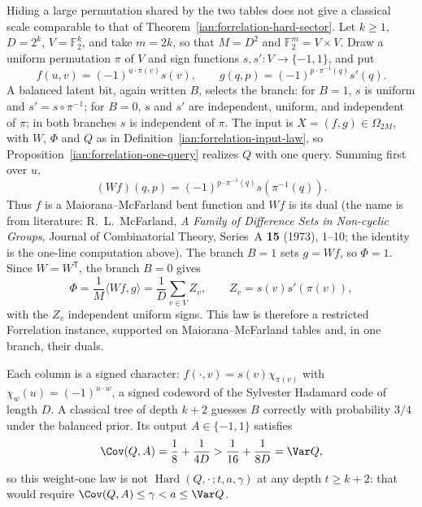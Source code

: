 \begin{remark}\label{ian:forrelation-permutation-overlap}
Hiding a large permutation shared by the two tables does not give a classical scale comparable to that of Theorem~\ref{ian:forrelation-hard-sector}. Let \(k\ge1\), \(D=2^k\), \(V=\mathbb F_2^k\), and take \(m=2k\), so that \(M=D^2\) and \(\mathbb F_2^m=V\times V\). Draw a uniform permutation \(\pi\) of \(V\) and sign functions \(s,s':V\to\{-1,1\}\), and put
\[
 f(u,v)=(-1)^{u\cdot\pi(v)}s(v),
 \qquad
 g(q,p)=(-1)^{p\cdot\pi^{-1}(q)}s'(q).
\]
A balanced latent bit, again written \(B\), selects the branch: for \(B=1\), \(s\) is uniform and \(s'=s\circ\pi^{-1}\); for \(B=0\), \(s\) and \(s'\) are independent, uniform, and independent of \(\pi\); in both branches \(s\) is independent of \(\pi\). The input is \(X=(f,g)\in\Omega_{2M}\), with \(W\), \(\Phi\) and \(Q\) as in Definition~\ref{ian:forrelation-input-law}, so Proposition~\ref{ian:forrelation-one-query} realizes \(Q\) with one query. Summing first over \(u\),
\[
 (Wf)(q,p)=(-1)^{p\cdot\pi^{-1}(q)}s(\pi^{-1}(q)).
\]
Thus \(f\) is a Maiorana--McFarland bent function and \(Wf\) is its dual (the name is from literature: R.~L.~McFarland, \emph{A Family of Difference Sets in Non-cyclic Groups}, Journal of Combinatorial Theory, Series~A \textbf{15} (1973), 1--10; the identity is the one-line computation above). The branch \(B=1\) sets \(g=Wf\), so \(\Phi=1\). Since \(W=W^{\mathsf T}\), the branch \(B=0\) gives
\[
 \Phi=\frac1M\langle Wf,g\rangle=\frac1D\sum_{v\in V}Z_v,
 \qquad Z_v=s(v)s'(\pi(v)),
\]
with the \(Z_v\) independent uniform signs. This law is therefore a restricted Forrelation instance, supported on Maiorana--McFarland tables and, in one branch, their duals.

Each column is a signed character: \(f(\cdot,v)=s(v)\chi_{\pi(v)}\) with \(\chi_w(u)=(-1)^{u\cdot w}\), a signed codeword of the Sylvester Hadamard code of length \(D\). A classical tree of depth \(k+2\) guesses \(B\) correctly with probability \(3/4\) under the balanced prior. Its output \(A\in\{-1,1\}\) satisfies
\[
 \Cov(Q,A)=\frac18+\frac1{4D}>\frac1{16}+\frac1{8D}=\Var Q,
\]
so this weight-one law is not \(\operatorname{Hard}(Q,\cdot\,;t,a,\gamma)\) at any depth \(t\ge k+2\): that would require \(\Cov(Q,A)\le\gamma<a\le\Var Q\).


\end{remark}
